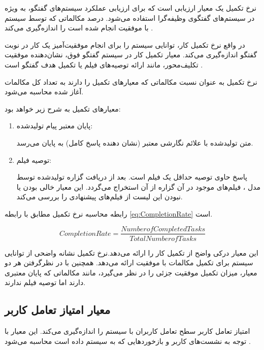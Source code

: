 نرخ تکمیل یک معیار ارزیابی است که برای ارزیابی عملکرد سیستم‌های گفتگو، به ویژه در سیستم‌های گفتگوی وظیفه‌گرا استفاده می‌شود. درصد مکالماتی که توسط سیستم با موفقیت انجام شده است را اندازه‌گیری می‌کند%
\cite{sekulic2024reliable}
.

در واقع نرخ تکمیل کار، توانایی سیستم را برای انجام موفقیت‌آمیز یک کار در نوبت گفتگو اندازه‌گیری می‌کند. معیار تکمیل کار در سیستم گفتگو فوق، نشان‌دهنده موفقیت تکلیف‌محور، مانند ارائه توصیه‌های فیلم یا تکمیل هدف گفتگو است %
\cite{xu2024beyond}
.
 
نرخ تکمیل به عنوان نسبت مکالماتی که معیارهای تکمیل را دارند به تعداد کل مکالمات آغاز شده محاسبه می‌شود.

معیارهای تکمیل به شرح زیر خواهد بود:
\begin{enumerate}
\item
پایان معتبر پیام تولید‌شده: 

متن تولید‌شده با علائم نگارشی معتبر (نشان دهنده پاسخ کامل) به پایان می‌‌رسد.
\item
توصیه فیلم: 

پاسخ حاوی توصیه حداقل یک فیلم است. بعد از دریافت گزاره تولیدشده توسط مدل ، فیلم‌های موجود در آن گزاره از آن استخراج  می‌گردد. این معیار خالی بودن یا نبودن این لیست از فیلم‌های پیشنهادی را بررسی می‌کند.
\end{enumerate}

رابطه محاسبه نرخ تکمیل مطابق با رابطه 
\ref{eq:CompletionRate}
است.

\begin{LTR}
\begin{equation}
\label{eq:CompletionRate}
Completion Rate = \frac{Number of Completed Tasks}{Total Number of Tasks}
\end{equation}
\end{LTR}



این معیار درکی واضح از تکمیل کار را ارائه می‌دهد.نرخ تکمیل نشانه واضحی از توانایی سیستم برای تکمیل مکالمات با موفقیت ارائه می‌دهد.
همچنین با در نظرگرفتن هر دو معیار، میزان تکمیل موفقیت جزئی را در نظر می‌گیرد، مانند مکالماتی که پایان معتبری دارند اما توصیه فیلم ندارند.

\subsection[معیار امتیاز تعامل کاربر]{معیار امتیاز تعامل کاربر}

امتیاز تعامل کاربر سطح تعامل کاربران با سیستم را اندازه‌گیری می‌کند. این معیار با توجه به نشست‌های کاربر و بازخوردهایی که به سیستم داده است محاسبه می‌شود
\cite{es2023ragas}
.

